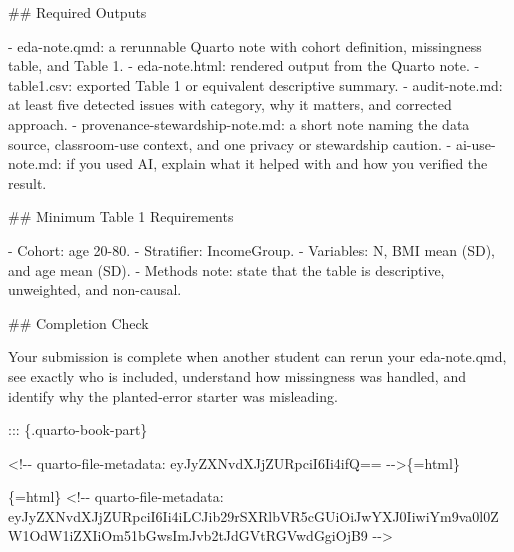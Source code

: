 \documentclass[
  letterpaper,
  DIV=11,
  numbers=noendperiod,
  oneside]{scrreprt}
\newenvironment{Shaded}{\begin{snugshade}}{\end{snugshade}}
\newcommand{\FunctionTok}[1]{\textcolor[rgb]{0.28,0.35,0.67}{#1}}
\newcommand{\InformationTok}[1]{\textcolor[rgb]{0.37,0.37,0.37}{#1}}
\newcommand{\NormalTok}[1]{\textcolor[rgb]{0.00,0.23,0.31}{#1}}
\newcommand{\SpecialStringTok}[1]{\textcolor[rgb]{0.13,0.47,0.30}{#1}}
\begin{document}
\begin{Shaded}
\begin{Highlighting}[numbers=left,,]
\FunctionTok{\#\# Required Outputs}

\SpecialStringTok{{-} }\InformationTok{\textasciigrave{}eda{-}note.qmd\textasciigrave{}}\NormalTok{: a rerunnable Quarto note with cohort definition, missingness table, and Table 1.}
\SpecialStringTok{{-} }\InformationTok{\textasciigrave{}eda{-}note.html\textasciigrave{}}\NormalTok{: rendered output from the Quarto note.}
\SpecialStringTok{{-} }\InformationTok{\textasciigrave{}table1.csv\textasciigrave{}}\NormalTok{: exported Table 1 or equivalent descriptive summary.}
\SpecialStringTok{{-} }\InformationTok{\textasciigrave{}audit{-}note.md\textasciigrave{}}\NormalTok{: at least five detected issues with category, why it matters, and corrected approach.}
\SpecialStringTok{{-} }\InformationTok{\textasciigrave{}provenance{-}stewardship{-}note.md\textasciigrave{}}\NormalTok{: a short note naming the data source, classroom{-}use context, and one privacy or stewardship caution.}
\SpecialStringTok{{-} }\InformationTok{\textasciigrave{}ai{-}use{-}note.md\textasciigrave{}}\NormalTok{: if you used AI, explain what it helped with and how you verified the result.}

\FunctionTok{\#\# Minimum Table 1 Requirements}

\SpecialStringTok{{-} }\NormalTok{Cohort: age 20{-}80.}
\SpecialStringTok{{-} }\NormalTok{Stratifier: }\InformationTok{\textasciigrave{}IncomeGroup\textasciigrave{}}\NormalTok{.}
\SpecialStringTok{{-} }\NormalTok{Variables: N, BMI mean (SD), and age mean (SD).}
\SpecialStringTok{{-} }\NormalTok{Methods note: state that the table is descriptive, unweighted, and non{-}causal.}

\FunctionTok{\#\# Completion Check}

\NormalTok{Your submission is complete when another student can rerun your }\InformationTok{\textasciigrave{}eda{-}note.qmd\textasciigrave{}}\NormalTok{, see exactly who is included, understand how missingness was handled, and identify why the planted{-}error starter was misleading.}


\NormalTok{::: \{.quarto{-}book{-}part\}}


\InformationTok{\textasciigrave{}\textless{}!{-}{-} quarto{-}file{-}metadata: eyJyZXNvdXJjZURpciI6Ii4ifQ== {-}{-}\textgreater{}\textasciigrave{}}\NormalTok{\{=html\}}

\InformationTok{\textasciigrave{}\textasciigrave{}\textasciigrave{}\{=html\}}
\InformationTok{\textless{}!{-}{-} quarto{-}file{-}metadata: eyJyZXNvdXJjZURpciI6Ii4iLCJib29rSXRlbVR5cGUiOiJwYXJ0IiwiYm9va0l0ZW1OdW1iZXIiOm51bGwsImJvb2tJdGVtRGVwdGgiOjB9 {-}{-}\textgreater{}}
\InformationTok{\textasciigrave{}\textasciigrave{}\textasciigrave{}}


\end{Highlighting}
\end{Shaded}
\end{document}

